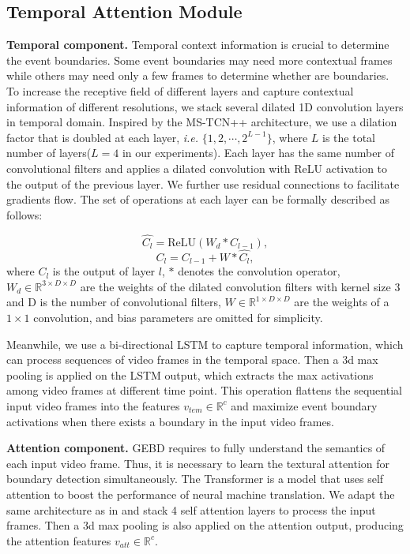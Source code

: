 \documentclass[final]{cvpr}
\begin{document}
\subsection{Temporal Attention Module}
\noindent\textbf{Temporal component.} Temporal context information is crucial to determine the event boundaries. Some event boundaries may need more contextual frames while others may need only a few frames to determine whether are boundaries. To increase the receptive field of different layers and capture contextual information of different resolutions, we stack several dilated 1D convolution layers in temporal domain. Inspired by the MS-TCN++ \cite{DBLP:journals/corr/MS-TCN++} architecture, we use a dilation factor that is doubled at each layer, \textit{i.e.} $\lbrace1,2,\cdots, 2^{L-1}\rbrace$, where $L$ is the total number of layers($L=4$ in our experiments). Each layer has the same number of convolutional filters and applies a dilated convolution with ReLU activation to the output of the previous layer. We further use residual connections to facilitate gradients flow. The set of operations at each layer can be formally described as follows:

\begin{equation}
	 \hat{C_l} = \text{ReLU}(W_d * C_{l-1}) ,
\end{equation}
\begin{equation}
	C_l = C_{l-1} + W * \hat{C_l} ,
\end{equation}
where $C_l$ is the output of layer $l$, $*$ denotes the convolution operator, $W_d \in \mathbb{R}^{3 \times D \times D}$ are the weights of the dilated convolution filters with kernel size 3 and D is the number of convolutional filters, $W \in \mathbb{R}^{1 \times D \times D}$ are the weights of a $1\times1$ convolution, and bias parameters are omitted for simplicity.

Meanwhile, we use a bi-directional LSTM \cite{DBLP:journals/neco/LSTM} to capture temporal information, which can process sequences of video frames in the temporal space. Then a 3d max pooling is applied on the LSTM output, which extracts the max activations among video frames at different time point. This operation flattens the sequential input video frames into the features $v_{tem} \in \mathbb{R}^c$ and maximize event boundary activations when there exists a boundary in the input video frames.

\noindent\textbf{Attention component.} GEBD requires to fully understand the semantics of each input video frame. Thus, it is necessary to learn the textural attention for boundary detection simultaneously. The Transformer \cite{DBLP:conf/nips/attention} is a model that uses self attention to boost the performance of neural machine translation. We adapt the same architecture as in \cite{DBLP:conf/nips/attention} and stack 4 self attention layers to process the input frames. Then a 3d max pooling is also applied on the attention output, producing the attention features $v_{att} \in \mathbb{R}^c$.
\end{document}
